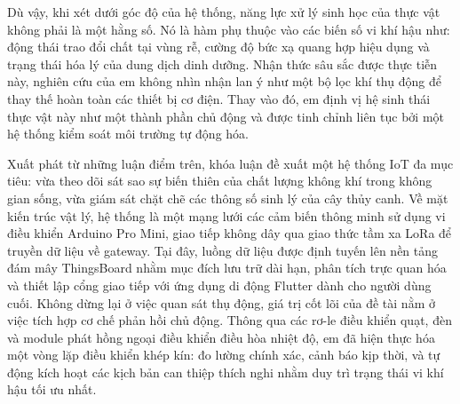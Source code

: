 Dù vậy, khi xét dưới góc độ của hệ thống, năng lực xử lý sinh học của thực vật không phải là một hằng số. Nó là hàm phụ thuộc vào các biến số vi khí hậu như: động thái trao đổi chất tại vùng rễ, cường độ bức xạ quang hợp hiệu dụng và trạng thái hóa lý của dung dịch dinh dưỡng. Nhận thức sâu sắc được thực tiễn này, nghiên cứu của em không nhìn nhận lan ý như một bộ lọc khí thụ động để thay thế hoàn toàn các thiết bị cơ điện. Thay vào đó, em định vị hệ sinh thái thực vật này như một thành phần chủ động và được tinh chỉnh liên tục bởi một hệ thống kiểm soát môi trường tự động hóa.

Xuất phát từ những luận điểm trên, khóa luận  đề xuất một hệ thống IoT đa mục tiêu: vừa theo dõi sát sao sự biến thiên của chất lượng không khí trong không gian sống, vừa giám sát chặt chẽ các thông số sinh lý của cây thủy canh. Về mặt kiến trúc vật lý, hệ thống là một mạng lưới các cảm biến thông minh sử dụng vi điều khiển Arduino Pro Mini, giao tiếp không dây qua giao thức tầm xa LoRa để truyền dữ liệu về gateway. Tại đây, luồng dữ liệu được định tuyến lên nền tảng đám mây ThingsBoard nhằm mục đích lưu trữ dài hạn, phân tích trực quan hóa và thiết lập cổng giao tiếp với ứng dụng di động Flutter dành cho người dùng cuối. Không dừng lại ở việc quan sát thụ động, giá trị cốt lõi của đề tài nằm ở việc tích hợp cơ chế phản hồi chủ động. Thông qua các rơ-le điều khiển quạt, đèn và module phát hồng ngoại điều khiển điều hòa nhiệt độ, em đã hiện thực hóa một vòng lặp điều khiển khép kín: đo lường chính xác, cảnh báo kịp thời, và tự động kích hoạt các kịch bản can thiệp thích nghi nhằm duy trì trạng thái vi khí hậu tối ưu nhất.